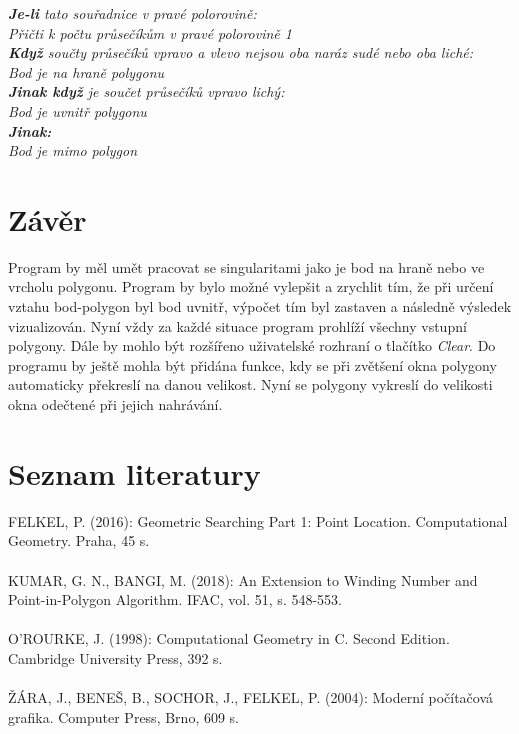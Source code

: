 \documentclass{article}
\begin{document}
\indent\indent\indent\textit{\textbf{Je-li} tato souřadnice v pravé polorovině:}\\
\indent\indent\indent\indent\textit{Přičti k počtu průsečíkům v pravé polorovině 1}\\
\indent\textit{\textbf{Když} součty průsečíků vpravo a vlevo nejsou oba naráz sudé nebo oba liché:}\\
\indent\indent\textit{Bod je na hraně polygonu}\\
\indent\textit{\textbf{Jinak když} je součet průsečíků vpravo lichý:}\\
\indent\indent\textit{Bod je uvnitř polygonu}\\
\indent\textit{\textbf{Jinak:}}\\
\indent\indent\textit{Bod je mimo polygon}\\
\section{\large{Závěr}}
Program by měl umět pracovat se singularitami jako je bod na hraně nebo ve vrcholu polygonu. Program by bylo možné vylepšit a zrychlit tím, že při určení vztahu bod-polygon byl bod uvnitř, výpočet tím byl zastaven a následně výsledek vizualizován. Nyní vždy za každé situace program prohlíží všechny vstupní polygony. Dále by mohlo být rozšířeno uživatelské rozhraní o tlačítko \emph{Clear}. Do programu by ještě mohla být přidána funkce, kdy se při zvětšení okna polygony automaticky překreslí na danou velikost. Nyní se polygony vykreslí do velikosti okna odečtené při jejich nahrávání.
\section{\large{Seznam literatury}}
FELKEL, P. (2016): Geometric Searching Part 1: Point Location. Computational Geometry. Praha, 45 s.\\
\vspace{0.1cm}\\
KUMAR, G. N., BANGI, M. (2018): An Extension to Winding Number and Point-in-Polygon Algorithm. IFAC, vol. 51, s. 548-553.\\
\vspace{0.1cm}\\
O'ROURKE, J. (1998): Computational Geometry in C. Second Edition. Cambridge University Press, 392 s.\\
\vspace{0.1cm}\\
ŽÁRA, J., BENEŠ, B., SOCHOR, J., FELKEL, P. (2004): Moderní počítačová grafika. Computer Press, Brno, 609 s.\\
\end{document}
